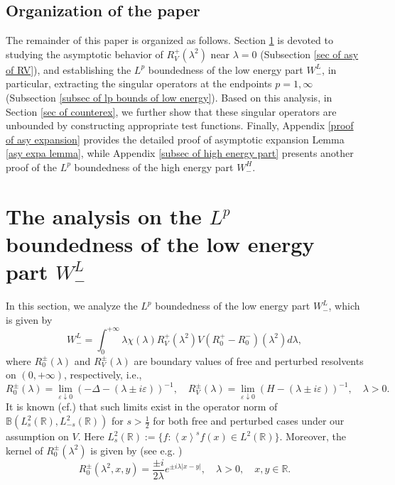 \documentclass[reqno]{amsart}
\newcommand\R{\mathbb{R}}
\newcommand\B{\mathbb{B}}
\numberwithin{equation}{section}
\begin{document}
\subsection{Organization of the paper}
The remainder of this paper is organized as follows. Section \ref{sec: analysis of Lp bounds of low energy} is devoted to studying the asymptotic behavior of $R^{+}_V(\lambda^2)$ near $\lambda=0$ (Subsection \ref{sec of asy of RV}), and establishing the $L^p$ boundedness of the low energy part $W^L_{-}$, in particular, extracting the singular operators at the endpoints $p=1,\infty$ (Subsection \ref{subsec of lp bounds of low energy}). Based on this analysis, in Section \ref{sec of counterex}, we further show that these singular operators are unbounded by constructing appropriate test functions. Finally, Appendix \ref{proof of asy expansion} provides the detailed proof of asymptotic expansion Lemma \ref{asy expa lemma}, while Appendix 
\ref{subsec of high energy part} presents another proof of the $L^p$ boundedness of the high energy part $W^H_{-}$.

\section{The analysis on the $L^p$ boundedness of the low energy part $W^L_{-}$}\label{sec: analysis of Lp bounds of low energy}
In this section, we analyze the $L^p$ boundedness of the low energy part $W^L_{-}$, which is given by 
\begin{equation}\label{expre of low energy}
W^{L}_{-}=\int_{0}^{+\infty}\lambda\chi(\lambda)R^{+}_{V}(\lambda^{2})V(R^+_{0}-R^-_{0})({\lambda}^{2})d\lambda,
\end{equation}
where $R^{\pm}_{0}(\lambda)$ and $R^{\pm}_{V}(\lambda)$ are boundary values of free and perturbed resolvents on $(0,+\infty)$, respectively, i.e.,
 $$R^{\pm}_{0}(\lambda)=\lim_{\varepsilon\downarrow0}(-\Delta-(\lambda\pm i\varepsilon))^{-1},\quad R^{\pm}_{V}(\lambda)=\lim_{\varepsilon\downarrow0}(H-(\lambda\pm i\varepsilon))^{-1},\quad \lambda>0.$$
 It is known (cf.\cite{Kur73,Agm75}) that such limits exist in the operator norm of $\B(L^2_{s}(\R),L^2_{-s}(\R))$ for $s>\frac{1}{2}$ for both free and perturbed cases under our assumption on $V$. Here 
 $L^2_s(\R):=\{f:\left<x\right>^sf(x)\in L^2(\R)\}.$ Moreover, the kernel of $R^{\pm}_0(\lambda^2)$ is given by (see e.g. \cite{JN01})   
\begin{equation}\label{kernel of free resol}
R^{\pm}_{0}(\lambda^{2},x,y)=\frac{\pm i}{2\lambda}e^{\pm i\lambda|x-y|},\quad \lambda>0,\quad x,y\in\R.
\end{equation}
\end{document}
